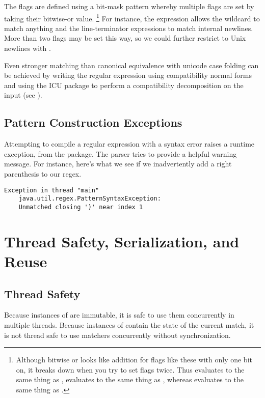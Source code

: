 The flags are defined using a bit-mask pattern whereby multiple
flags are set by taking their bitwise-or value.%
%
\footnote{Although bitwise or looks like addition for flags like
these with only one bit on, it breaks down when you try to set
flags twice.  Thus  evaluates to the
same thing as , 
evaluates to the same thing as , whereas
 evaluates to the same thing as .}
%
For instance,
the expression  allows the wildcard
to match anything and the line-terminator expressions to match
internal newlines.  More than two flags may be set this way,
so we could further restrict to Unix newlines with
.  

Even stronger matching than canonical equivalence with unicode case
folding can be achieved by writing the regular expression using
compatibility normal forms and using the ICU package to perform a
compatibility decomposition on the input (see
).


\subsection{Pattern Construction Exceptions}

Attempting to compile a regular expression with a syntax error raises
a runtime exception,  from the
 package.  The parser tries to provide a helpful
warning message.  For instance, here's what we see if we inadvertently
add a right parenthesis to our regex.
%
%
\begin{verbatim}
Exception in thread "main" 
    java.util.regex.PatternSyntaxException:  
    Unmatched closing ')' near index 1
\end{verbatim}



\section{Thread Safety, Serialization, and Reuse}

\subsection{Thread Safety}

Because instances of  are immutable, it is safe to use
them concurrently in multiple threads.  Because instances of
 contain the state of the current match, it is not
thread safe to use matchers concurrently without synchronization.

